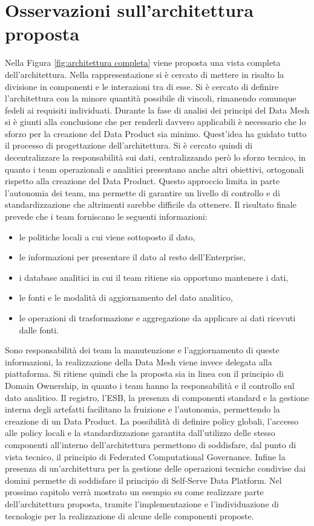 \documentclass[12pt]{report}
\begin{document}
\section{Osservazioni sull'architettura proposta}
Nella Figura \ref{fig:architettura completa} viene proposta una vista completa dell'architettura.
Nella rappresentazione si è cercato di mettere in risalto la divisione in componenti e le interazioni tra di esse.
Si è cercato di definire l'architettura con la minore quantità possibile di vincoli, rimanendo comunque fedeli ai requisiti individuati.
Durante la fase di analisi dei principi del Data Mesh si è giunti alla conclusione che per renderli davvero applicabili è necessario che lo sforzo per la creazione del Data Product sia minimo.
Quest'idea ha guidato tutto il processo di progettazione dell'architettura.
Si è cercato quindi di decentralizzare la responsabilità sui dati, centralizzando però lo sforzo tecnico, in quanto i team operazionali e analitici presentano anche altri obiettivi, ortogonali rispetto alla creazione del Data Product.
Questo approccio limita in parte l'autonomia dei team, ma permette di garantire un livello di controllo e di standardizzazione che altrimenti sarebbe difficile da ottenere.
Il risultato finale prevede che i team forniscano le seguenti informazioni:
\begin{itemize}
    \item le politiche locali a cui viene sottoposto il dato,
    \item le informazioni per presentare il dato al resto dell'Enterprise,
    \item i database analitici in cui il team ritiene sia opportuno mantenere i dati,
    \item le fonti e le modalità di aggiornamento del dato analitico,
    \item le operazioni di trasformazione e aggregazione da applicare ai dati ricevuti dalle fonti.
\end{itemize}
Sono responsabilità dei team la manutenzione e l'aggiornamento di queste informazioni, la realizzazione della Data Mesh viene invece delegata alla piattaforma.
Si ritiene quindi che la proposta sia in linea con il principio di Domain Ownership, in quanto i team hanno la responsabilità  e il controllo sul dato analitico.
Il registro, l'ESB, la presenza di componenti standard e la gestione interna degli artefatti facilitano la fruizione e l'autonomia, permettendo la creazione di un Data Product.
La possibilità di definire policy globali, l'accesso alle policy locali e la standardizzazione garantita dall'utilizzo delle stesso componenti all'interno dell'architettura permettono di soddisfare, dal punto di vista tecnico, il principio di Federated Computational Governance.
Infine la presenza di un'architettura per la gestione delle operazioni tecniche condivise dai domini permette di soddisfare il principio di Self-Serve Data Platform.
Nel prossimo capitolo verrà mostrato un esempio su come realizzare parte dell'architettura proposta, tramite l'implementazione e l'individuazione di tecnologie per la realizzazione di alcune delle componenti proposte.
\end{document}
